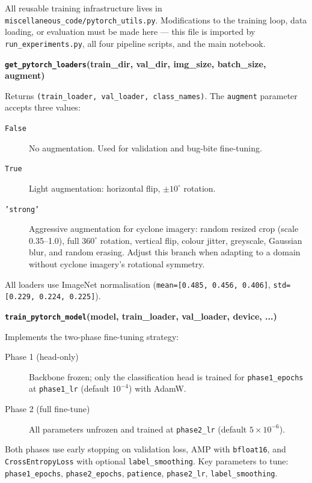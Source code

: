 \documentclass[12pt,a4paper]{article}
\begin{document}
All reusable training infrastructure lives in
\texttt{miscellaneous\_code/pytorch\_utils.py}. Modifications to the
training loop, data loading, or evaluation must be made here --- this
file is imported by \texttt{run\_experiments.py}, all four pipeline
scripts, and the main notebook.

\textbf{\texttt{get\_pytorch\_loaders}(train\_dir, val\_dir, img\_size,
batch\_size, augment)}

Returns \texttt{(train\_loader, val\_loader, class\_names)}. The
\texttt{augment} parameter accepts three values:

\begin{description}
    \item[\texttt{False}] No augmentation. Used for validation and
          bug-bite fine-tuning.
    \item[\texttt{True}] Light augmentation: horizontal flip,
          $\pm10^{\circ}$ rotation.
    \item[\texttt{'strong'}] Aggressive augmentation for cyclone imagery:
          random resized crop (scale 0.35--1.0), full $360^{\circ}$
          rotation, vertical flip, colour jitter, greyscale, Gaussian
          blur, and random erasing. Adjust this branch when adapting to
          a domain without cyclone imagery's rotational symmetry.
\end{description}

All loaders use ImageNet normalisation
(\texttt{mean=[0.485, 0.456, 0.406]}, \texttt{std=[0.229, 0.224, 0.225]}).

\textbf{\texttt{train\_pytorch\_model}(model, train\_loader, val\_loader,
device, ...)}

Implements the two-phase fine-tuning strategy:

\begin{description}
    \item[Phase 1 (head-only)] Backbone frozen; only the classification
          head is trained for \texttt{phase1\_epochs} at
          \texttt{phase1\_lr} (default $10^{-4}$) with AdamW.
    \item[Phase 2 (full fine-tune)] All parameters unfrozen and trained
          at \texttt{phase2\_lr} (default $5\times10^{-6}$).
\end{description}

Both phases use early stopping on validation loss, AMP with
\texttt{bfloat16}, and \texttt{CrossEntropyLoss} with optional
\texttt{label\_smoothing}. Key parameters to tune: \texttt{phase1\_epochs},
\texttt{phase2\_epochs}, \texttt{patience}, \texttt{phase2\_lr},
\texttt{label\_smoothing}.
\end{document}
